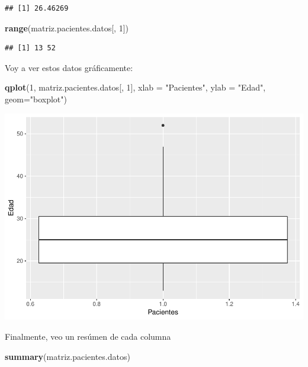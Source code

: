 \documentclass[]{article}
\newenvironment{Shaded}{\begin{snugshade}}{\end{snugshade}}
\newcommand{\KeywordTok}[1]{\textcolor[rgb]{0.13,0.29,0.53}{\textbf{#1}}}
\newcommand{\DataTypeTok}[1]{\textcolor[rgb]{0.13,0.29,0.53}{#1}}
\newcommand{\DecValTok}[1]{\textcolor[rgb]{0.00,0.00,0.81}{#1}}
\newcommand{\StringTok}[1]{\textcolor[rgb]{0.31,0.60,0.02}{#1}}
\newcommand{\NormalTok}[1]{#1}
\begin{document}
\begin{verbatim}
## [1] 26.46269
\end{verbatim}

\begin{Shaded}
\begin{Highlighting}[]
\KeywordTok{range}\NormalTok{(matriz.pacientes.datos[, }\DecValTok{1}\NormalTok{])}
\end{Highlighting}
\end{Shaded}

\begin{verbatim}
## [1] 13 52
\end{verbatim}

Voy a ver estos datos gráficamente:

\begin{Shaded}
\begin{Highlighting}[]
\KeywordTok{qplot}\NormalTok{(}\DecValTok{1}\NormalTok{, matriz.pacientes.datos[, }\DecValTok{1}\NormalTok{], }\DataTypeTok{xlab =} \StringTok{"Pacientes"}\NormalTok{, }\DataTypeTok{ylab =} \StringTok{"Edad"}\NormalTok{, }\DataTypeTok{geom=}\StringTok{"boxplot"}\NormalTok{)}
\end{Highlighting}
\end{Shaded}

\includegraphics{codigo_files/figure-latex/grafico_estadistica_edad-1.pdf}

Finalmente, veo un resúmen de cada columna

\begin{Shaded}
\begin{Highlighting}[]
\KeywordTok{summary}\NormalTok{(matriz.pacientes.datos)}
\end{Highlighting}
\end{Shaded}
\end{document}
